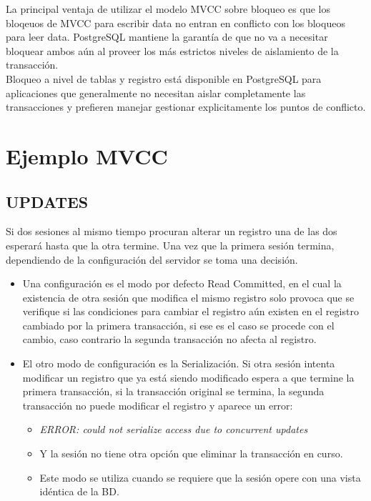 La principal ventaja de utilizar el modelo MVCC sobre bloqueo es que los bloqeuos de MVCC para escribir data no entran en conflicto con los bloqueos para leer data. PostgreSQL mantiene la garantía de que no va a necesitar bloquear ambos aún al proveer los más estrictos niveles de aislamiento de la transacción.\\

Bloqueo a nivel de tablas y registro está disponible en PostgreSQL para aplicaciones que generalmente no necesitan aislar completamente las transacciones y prefieren manejar gestionar explicitamente los puntos de conflicto.

\section{Ejemplo MVCC}

\subsection{UPDATES}

Si dos sesiones al mismo tiempo procuran alterar un registro una de las dos esperará hasta que la otra termine. Una vez que la primera sesión termina, dependiendo de la configuración del servidor se toma una decisión.

\begin{itemize}
\item Una configuración es el modo por defecto Read Committed, en el cual la existencia de otra sesión que modifica el mismo registro solo provoca que se verifique si las condiciones para cambiar el registro aún existen en el registro cambiado por la primera transacción, si ese es el caso se procede con el cambio, caso contrario la segunda transacción no afecta al registro.
\item El otro modo de configuración es la Serialización. Si otra sesión intenta modificar un registro que ya está siendo modificado espera a que termine la primera transacción, si la transacción original se termina, la segunda transacción no puede modificar el registro y aparece un error:

\begin{itemize}
\item \textit{ERROR: could not serialize access due to concurrent updates}
\item Y la sesión no tiene otra opción que eliminar la transacción en curso.
\item Este modo se utiliza cuando se requiere que la sesión opere con una vista idéntica de la BD.
\end{itemize}

\end{itemize}

